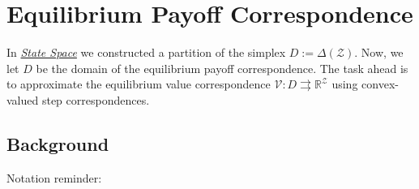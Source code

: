 \documentclass[a4paper,10pt,english]{sphinxmanual}
\begin{document}
\chapter{Equilibrium Payoff Correspondence}
\label{payoff_approximation:equilibrium-payoff-correspondence}\label{payoff_approximation::doc}
In {\hyperref[statespace::doc]{\emph{State Space}}} we constructed a partition of the simplex $D:= \Delta(\mathcal{Z})$. Now, we let $D$ be the domain of the equilibrium payoff correspondence.
The task ahead is to approximate the equilibrium value correspondence $\mathcal{V}: D
\rightrightarrows \mathbb{R}^{\mathcal{Z}}$ using
convex-valued step correspondences.


\section{Background}
\label{payoff_approximation:background}
Notation reminder:
\end{document}
